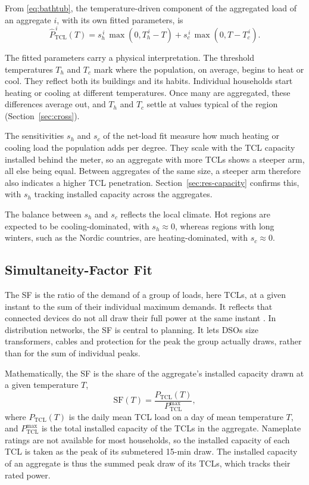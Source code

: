 From \eqref{eq:bathtub}, the temperature-driven component of the aggregated load of an aggregate $i$, with its own fitted parameters, is
\begin{equation}
\hat{P}_{\mathrm{TCL}}^{\,i}(T) = s_h^{\,i}\,\max(0, T_h^{\,i} - T) + s_c^{\,i}\,\max(0, T - T_c^{\,i}).
\label{eq:tclfit}
\end{equation}

The fitted parameters carry a physical interpretation. The threshold temperatures $T_h$ and $T_c$ mark where the population, on average, begins to heat or cool. They reflect both its buildings and its habits. Individual households start heating or cooling at different temperatures. Once many are aggregated, these differences average out, and $T_h$ and $T_c$ settle at values typical of the region (Section~\ref{sec:cross}).

The sensitivities $s_h$ and $s_c$ of the net-load fit measure how much heating or cooling load the population adds per degree.
They scale with the TCL capacity installed behind the meter, so an aggregate with more TCLs shows a steeper arm, all else being equal. Between aggregates of the same size, a steeper arm therefore also indicates a higher TCL penetration. Section~\ref{sec:res-capacity} confirms this, with $s_h$ tracking installed capacity across the aggregates.

The balance between $s_h$ and $s_c$ reflects the local climate. Hot regions are expected to be cooling-dominated, with $s_h \approx 0$, whereas regions with long winters, such as the Nordic countries, are heating-dominated, with $s_c \approx 0$.

\subsection{Simultaneity-Factor Fit}
\label{sec:fits-sf}

The SF is the ratio of the demand of a group of loads, here TCLs, at a given instant to the sum of their individual maximum demands. It reflects that connected devices do not all draw their full power at the same instant \cite{fani2024impact}. In distribution networks, the SF is central to planning. It lets DSOs size transformers, cables and protection for the peak the group actually draws, rather than for the sum of individual peaks.

Mathematically, the SF is the share of the aggregate's installed capacity drawn at a given temperature $T$,
\begin{equation}
\mathrm{SF}(T) = \frac{P_{\mathrm{TCL}}(T)}{P_{\mathrm{TCL}}^{\max}},
\label{eq:sf}
\end{equation}
where $P_{\mathrm{TCL}}(T)$ is the daily mean TCL load on a day of mean temperature $T$, and $P_{\mathrm{TCL}}^{\max}$ is the total installed capacity of the TCLs in the aggregate. Nameplate ratings are not available for most households, so the installed capacity of each TCL is taken as the peak of its submetered 15-min draw. The installed capacity of an aggregate is thus the summed peak draw of its TCLs, which tracks their rated power.

